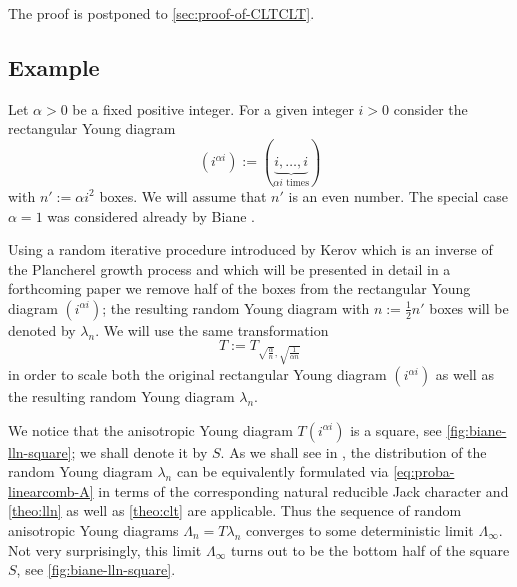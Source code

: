 \documentclass[12pt,usenames,dvipsnames,svgnames,table]{amsart}
\begin{document}
The proof is postponed to \cref{sec:proof-of-CLTCLT}.

\subsection{Example}
\label{example:removal-of-boxes}

Let $\alpha>0$ be a fixed positive integer.
For a given integer $i>0$ consider the rectangular Young diagram
\[  (i^{\alpha i}):=(\underbrace{i,\dots,i}_{\text{$\alpha i$ times}})\]
with $n':=\alpha i^2$ boxes. We will assume that $n'$ is an even number.
The special case $\alpha=1$ was considered already by Biane
\cite[Figures 1--3]{Biane1998}. 

Using a random iterative procedure introduced by Kerov
\cite{Kerov1996boundaryYounglattice}
which is an inverse of the Plancherel growth process 
and which will be presented in detail in
a forthcoming paper \cite{DolegaSniady-examples-AFP} 
we remove half of the boxes from the rectangular Young diagram 
$(i^{\alpha i})$; the resulting random Young diagram with $n:=\frac{1}{2} n'$ boxes
will be denoted by $\lambda_n$. We will use the same transformation 
\[T:=T_{\sqrt{\frac{\alpha}{n}},\sqrt{\frac{1}{\alpha n}}}\] in order to scale both 
the original rectangular Young diagram $(i^{\alpha i})$ as well as the resulting
random Young diagram $\lambda_n$.

We notice that the anisotropic Young diagram $T(i^{\alpha i})$ is a square,
see \cref{fig:biane-lln-square};
we shall denote it by $S$. 
As we shall see in \cite{DolegaSniady-examples-AFP}, 
the distribution of the random Young diagram $\lambda_n$ 
can be equivalently formulated via \eqref{eq:proba-linearcomb-A} 
in terms of the corresponding 
natural reducible Jack character and 
\cref{theo:lln} as well as \cref{theo:clt} are applicable. 
Thus the sequence of random anisotropic Young diagrams 
$\Lambda_n=T\lambda_n$ converges to some deterministic limit $\Lambda_\infty$.
Not very surprisingly, this limit $\Lambda_\infty$ turns out to be the bottom half 
of the square $S$, see \cref{fig:biane-lln-square}.
\end{document}

